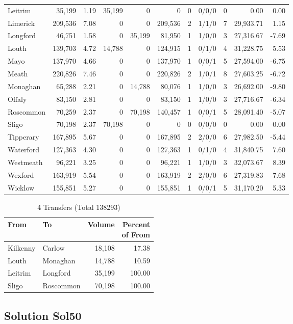 \documentclass[a4paper]{article}
\begin{document}
\begin{longtable}{lrrrrrrlrrr}
Leitrim&35,199& 1.19&35,199&0&0&0&0/0/0&0& 0.00& 0.00\\ 
Limerick&209,536& 7.08&0&0&209,536&2&1/1/0&7&29,933.71& 1.15\\ 
Longford&46,751& 1.58&0&35,199&81,950&1&1/0/0&3&27,316.67&-7.69\\ 
Louth&139,703& 4.72&14,788&0&124,915&1&0/1/0&4&31,228.75& 5.53\\ 
Mayo&137,970& 4.66&0&0&137,970&1&0/0/1&5&27,594.00&-6.75\\ 
Meath&220,826& 7.46&0&0&220,826&2&1/0/1&8&27,603.25&-6.72\\ 
Monaghan&65,288& 2.21&0&14,788&80,076&1&1/0/0&3&26,692.00&-9.80\\ 
Offaly&83,150& 2.81&0&0&83,150&1&1/0/0&3&27,716.67&-6.34\\ 
Roscommon&70,259& 2.37&0&70,198&140,457&1&0/0/1&5&28,091.40&-5.07\\ 
Sligo&70,198& 2.37&70,198&0&0&0&0/0/0&0& 0.00& 0.00\\ 
Tipperary&167,895& 5.67&0&0&167,895&2&2/0/0&6&27,982.50&-5.44\\ 
Waterford&127,363& 4.30&0&0&127,363&1&0/1/0&4&31,840.75& 7.60\\ 
Westmeath&96,221& 3.25&0&0&96,221&1&1/0/0&3&32,073.67& 8.39\\ 
Wexford&163,919& 5.54&0&0&163,919&2&2/0/0&6&27,319.83&-7.68\\ 
Wicklow&155,851& 5.27&0&0&155,851&1&0/0/1&5&31,170.20& 5.33\\ 
\end{longtable}

\begin{table}[htbp]
\caption{4 Transfers (Total 138293)}
\centering
\begin{tabular}{llrr} \toprule
From &To &Volume &\shortstack{Percent\\of From} \\ \midrule
Kilkenny&Carlow&18,108&17.38\\ 
Louth&Monaghan&14,788&10.59\\ 
Leitrim&Longford&35,199&100.00\\ 
Sligo&Roscommon&70,198&100.00\\ 
\bottomrule
\end{tabular}
\end{table}

\clearpage
\subsection{Solution Sol50}
\end{document}
